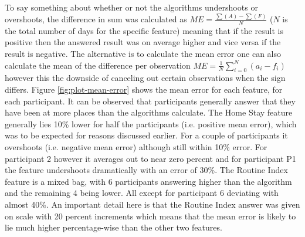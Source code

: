 To say something about whether or not the algorithms undershoots or overshoots, the difference in sum was calculated as $ME = \frac{\sum(A) - \sum(F)}{N}$ ($N$ is the total number of days for the specific feature) meaning that if the result is positive then the answered result was on average higher and vice versa if the result is negative. The alternative is to calculate the mean error one can also calculate the mean of the difference per observation $ME = \frac{1}{N} \sum_{i=0}^{N} (a_i - f_i)$ however this the downside of canceling out certain observations when the sign differs. Figure \ref{fig:plot-mean-error} shows the mean error for each feature, for each participant. It can be observed that participants generally answer that they have been at more places than the algorithms calculate. The Home Stay feature generally lies 10\% lower for half the participants (i.e. positive mean error), which was to be expected for reasons discussed earlier. For a couple of participants it overshoots (i.e. negative mean error) although still within 10\% error. For participant 2 however it averages out to near zero percent and for participant P1 the feature undershoots dramatically with an error of 30\%. The Routine Index feature is a mixed bag, with 6 participants answering higher than the algorithm and the remaining 4 being lower. All except for participant 6 deviating with almost 40\%. An important detail here is that the Routine Index answer was given on scale with 20 percent increments which means that the mean error is likely to lie much higher percentage-wise than the other two features.

